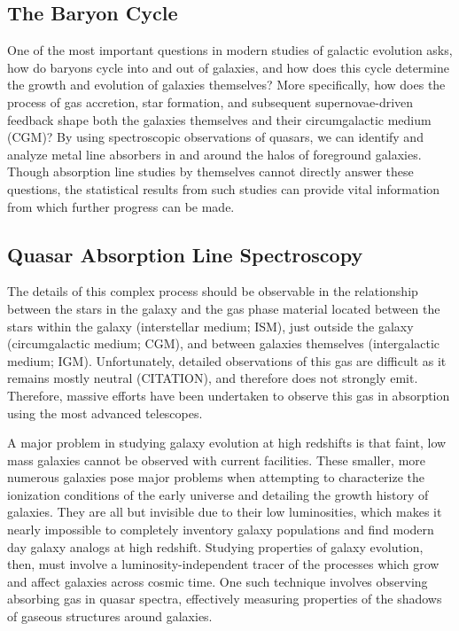 
\subsection{The Baryon Cycle}
\label{ch1:baryoncycle}

One of the most important questions in modern studies of galactic evolution asks, how do baryons cycle into and out of galaxies, and how does this cycle determine the growth and evolution of galaxies themselves? More specifically, how does the process of gas accretion, star formation, and subsequent supernovae-driven feedback shape both the galaxies themselves and their circumgalactic medium (CGM)? By using spectroscopic observations of quasars, we can identify and analyze metal line absorbers in and around the halos of foreground galaxies. Though absorption line studies by themselves cannot directly answer these questions, the statistical results from such studies can provide vital information from which further progress can be made.


\subsection{Quasar Absorption Line Spectroscopy}
\label{ch1:absorptionlines}

The details of this complex process should be observable in the relationship between the stars in the galaxy and the gas phase material located between the stars within the galaxy (interstellar medium; ISM), just outside the galaxy (circumgalactic medium; CGM), and between galaxies themselves (intergalactic medium; IGM). Unfortunately, detailed observations of this gas are difficult as it remains mostly neutral (CITATION), and therefore does not strongly emit. Therefore, massive efforts have been undertaken to observe this gas in absorption using the most advanced telescopes.

A major problem in studying galaxy evolution at high redshifts is that faint, low mass galaxies cannot be observed with current facilities. These smaller, more numerous galaxies pose major problems when attempting to characterize the ionization conditions of the early universe and detailing the growth history of galaxies. They are all but invisible due to their low luminosities, which makes it nearly impossible to completely inventory galaxy populations and find modern day galaxy analogs at high redshift. Studying properties of galaxy evolution, then, must involve a luminosity-independent tracer of the processes which grow and affect galaxies across cosmic time. One such technique involves observing absorbing gas in quasar spectra, effectively measuring properties of the shadows of gaseous structures around galaxies.

